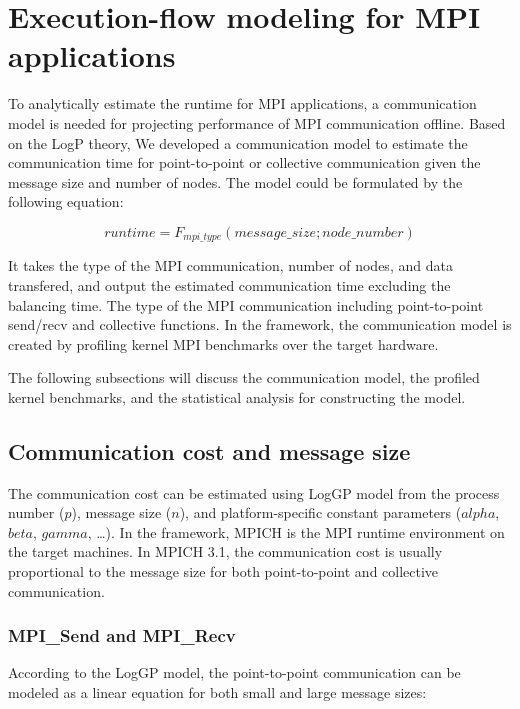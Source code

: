\section{Execution-flow modeling for MPI applications}
\label{sec:mpi:exeflow}

To analytically estimate the runtime for MPI applications, a
communication model is needed for projecting performance of MPI
communication offline.  Based on the LogP theory, We developed a
communication model to estimate the communication time for
point-to-point or collective communication given the message size and
number of nodes.  The model could be formulated by the following
equation:

\begin{equation}
runtime = F_{mpi\_type}(message\_size; node\_number)
\end{equation}

It takes the type of the MPI communication, number of nodes, and data
transfered, and output the estimated communication time excluding the
balancing time.  The type of the MPI communication including
point-to-point send/recv and collective functions.  In the framework,
the communication model is created by profiling kernel MPI benchmarks
over the target hardware.

The following subsections will discuss the communication model, the
profiled kernel benchmarks, and the statistical analysis for
constructing the model.


\subsection{Communication cost and message size}

The communication cost can be estimated using LogGP model from the
process number ($p$), message size ($n$), and platform-specific
constant parameters ($alpha$, $beta$, $gamma$, \ldots).  In the
framework, MPICH is the MPI runtime environment on the target
machines.  In MPICH 3.1, the communication cost is usually
proportional to the message size for both point-to-point and
collective communication.


\subsubsection{MPI\_Send and MPI\_Recv}

According to the LogGP model, the point-to-point communication can be
modeled as a linear equation for both small and large message sizes:

